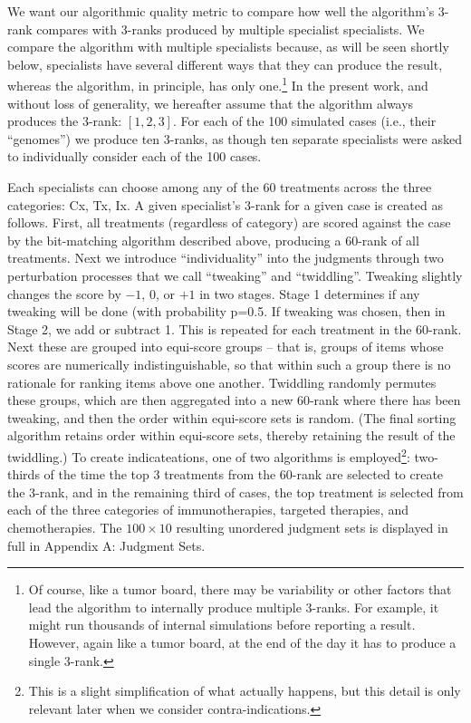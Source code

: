 \documentclass{article}
\begin{document}
We want our algorithmic quality metric to compare how well the algorithm's 3-rank compares with 3-ranks produced by multiple specialist specialists. We compare the algorithm with multiple specialists because, as will be seen shortly below, specialists have several different ways that they can produce the result, whereas the algorithm, in principle, has only one.\footnote{Of course, like a tumor board, there may be variability or other factors that lead the algorithm to internally produce multiple 3-ranks. For example, it might run thousands of internal simulations before reporting a result. However, again like a tumor board, at the end of the day it has to produce a single 3-rank.} In the present work, and without loss of generality, we hereafter assume that the algorithm always produces the 3-rank: $[1,2,3]$. For each of the 100 simulated cases (i.e., their ``genomes'') we produce ten 3-ranks, as though ten separate specialists were asked to individually consider each of the 100 cases. 

Each specialists can choose among any of the 60 treatments across the three categories: Cx, Tx, Ix. A given specialist's 3-rank for a given case is created as follows. First, all treatments (regardless of category) are scored against the case by the bit-matching algorithm described above, producing a 60-rank of all treatments. Next we introduce ``individuality'' into the judgments through two perturbation processes that we call ``tweaking'' and ``twiddling''. Tweaking slightly changes the score by $-1$, $0$, or $+1$ in two stages. Stage 1 determines if any tweaking will be done (with probability p=0.5. If tweaking was chosen, then in Stage 2, we add or subtract 1. This is repeated for each treatment in the 60-rank. Next these are grouped into equi-score groups -- that is, groups of items whose scores are numerically indistinguishable, so that within such a group there is no rationale for ranking items above one another. Twiddling randomly permutes these groups, which are then aggregated into a new 60-rank where there has been tweaking, and then the order within equi-score sets is random. (The final sorting algorithm retains order within equi-score sets, thereby retaining the result of the twiddling.) To create indicateations, one of two algorithms is employed\footnote{This is a slight simplification of what actually happens, but this detail is only relevant later when we consider contra-indications.}: two-thirds of the time the top 3 treatments from the 60-rank are selected to create the 3-rank, and in the remaining third of cases, the top treatment is selected from each of the three categories of immunotherapies, targeted therapies, and chemotherapies. The $100 \times 10$ resulting unordered judgment sets is displayed in full in Appendix A: Judgment Sets.
\end{document}
